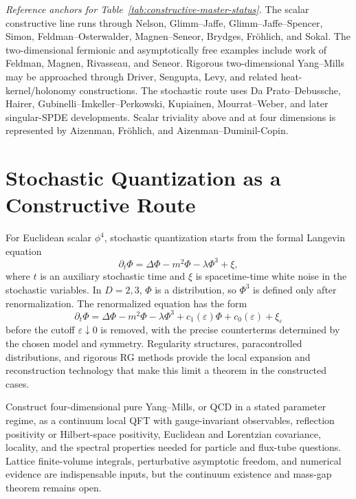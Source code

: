 \emph{Reference anchors for Table~\ref{tab:constructive-master-status}.}
The scalar constructive line runs through Nelson, Glimm--Jaffe,
Glimm--Jaffe--Spencer, Simon, Feldman--Osterwalder, Magnen--Seneor, Brydges,
Fr\"ohlich, and Sokal.  The two-dimensional fermionic and asymptotically free
examples include work of Feldman, Magnen, Rivasseau, and Seneor.  Rigorous
two-dimensional Yang--Mills may be approached through Driver, Sengupta, Levy,
and related heat-kernel/holonomy constructions.  The stochastic route uses
Da Prato--Debussche, Hairer, Gubinelli--Imkeller--Perkowski,
Kupiainen, Mourrat--Weber, and later singular-SPDE developments.  Scalar
triviality above and at four dimensions is represented by Aizenman,
Fr\"ohlich, and Aizenman--Duminil-Copin.

\section{Stochastic Quantization as a Constructive Route}

For Euclidean scalar \(\phi^4\), stochastic quantization starts from the
formal Langevin equation
\[
  \partial_t\Phi
  =
  \Delta\Phi-m^2\Phi-\lambda\Phi^3+\xi,
\]
where \(t\) is an auxiliary stochastic time and \(\xi\) is spacetime-time
white noise in the stochastic variables.  In \(D=2,3\), \(\Phi\) is a
distribution, so \(\Phi^3\) is defined only after renormalization.  The
renormalized equation has the form
\[
  \partial_t\Phi
  =
  \Delta\Phi-m^2\Phi-\lambda\Phi^3
  +c_1(\varepsilon)\Phi+c_0(\varepsilon)+\xi_\varepsilon
\]
before the cutoff \(\varepsilon\downarrow0\) is removed, with the precise
counterterms determined by the chosen model and symmetry.  Regularity
structures, paracontrolled distributions, and rigorous RG methods provide
the local expansion and reconstruction technology that make this limit a
theorem in the constructed cases.

\begin{openproblem}
\label{op:constructive-four-dimensional-gauge}
Construct four-dimensional pure Yang--Mills, or QCD in a stated parameter
regime, as a continuum local QFT with gauge-invariant observables, reflection
positivity or Hilbert-space positivity, Euclidean and Lorentzian covariance,
locality, and the spectral properties needed for particle and flux-tube
questions.  Lattice finite-volume integrals, perturbative asymptotic freedom,
and numerical evidence are indispensable inputs, but the continuum existence
and mass-gap theorem remains open.
\end{openproblem}
